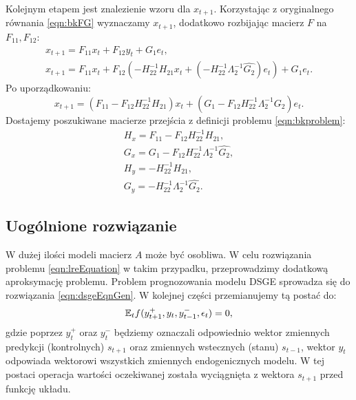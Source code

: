 Kolejnym etapem jest znalezienie wzoru dla $x_{t+1}$. Korzystając z oryginalnego równania \eqref{eqn:bkFG} wyznaczamy $x_{t+1}$, dodatkowo rozbijając macierz $F$ na $F_{11}, F_{12}$:
\begin{equation}
\begin{gathered}
    x_{t+1} = F_{11} x_t + F_{12} y_t + G_1 e_t, \\
    x_{t+1} = F_{11} x_t + F_{12} (-H_{22}^{-1} H_{21} x_t + (-H_{22}^{-1}\Lambda_2^{-1}\hat{G_2})e_t) + G_1 e_t.
\end{gathered}
\end{equation}
Po uporządkowaniu:
\begin{equation}
    x_{t+1} = (F_{11} - F_{12} H_{22}^{-1} H_{21}) x_t + (G_1 - F_{12} H_{22}^{-1}\Lambda_2^{-1}\hat{G_2}) e_t.
\end{equation}
Dostajemy poszukiwane macierze przejścia z definicji problemu \eqref{eqn:bkproblem}:
\begin{equation}
    \begin{gathered}
        H_x = F_{11} - F_{12} H_{22}^{-1} H_{21},\\
        G_x = G_1 - F_{12} H_{22}^{-1}\Lambda_2^{-1}\hat{G_2},\\
        H_y = -H_{22}^{-1} H_{21},\\
        G_y = -H_{22}^{-1}\Lambda_2^{-1}\hat{G_2}.
    \end{gathered}
\end{equation}

\subsection{Uogólnione rozwiązanie}
\label{sec:general_bk_solution}

W dużej ilości modeli macierz $A$ może być osobliwa. W celu rozwiązania problemu \eqref{eqn:lreEquation} w takim przypadku, przeprowadzimy dodatkową aproksymację problemu. Problem prognozowania modelu DSGE sprowadza się do rozwiązania \eqref{eqn:dsgeEqnGen}. W kolejnej części przemianujemy tą postać do:
\begin{equation}
    \label{eqn:genBkProblem}
    \mathbb{E}_t f(y_{t+1}^+, y_t, y_{t-1}^-, \epsilon_t) = 0,
\end{equation}
gdzie poprzez $y_t^+$ oraz $y_t^-$ będziemy oznaczali odpowiednio wektor zmiennych predykcji (kontrolnych) $s_{t+1}$ oraz zmiennych wstecznych (stanu) $s_{t-1}$, wektor $y_t$ odpowiada wektorowi wszystkich zmiennych endogenicznych modelu. W tej postaci operacja wartości oczekiwanej została wyciągnięta z wektora $s_{t+1}$ przed funkcję układu.

